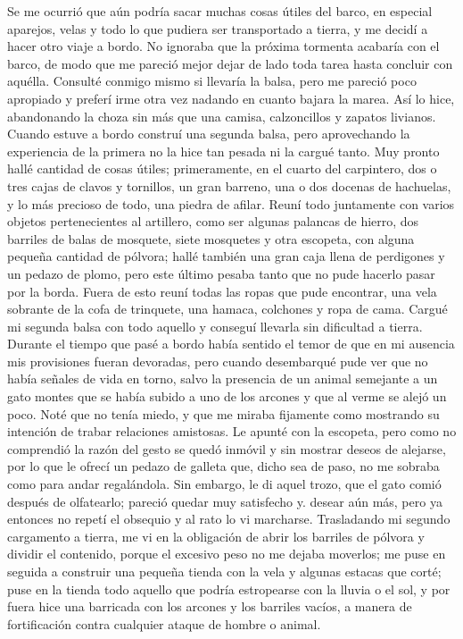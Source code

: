 \documentclass{novela}
\begin{document}
    Se me ocurrió que aún podría sacar muchas cosas útiles del barco, en especial aparejos, velas y todo lo que pudiera ser transportado a tierra, y me decidí a hacer otro viaje a bordo. No ignoraba que la próxima tormenta acabaría con el barco, de modo que me pareció mejor dejar de lado toda tarea hasta concluir con aquélla. Consulté conmigo mismo si llevaría la balsa, pero me pareció poco apropiado y preferí irme otra vez nadando en cuanto bajara la marea. Así lo hice, abandonando la choza sin más que una camisa, calzoncillos y zapatos livianos.
    Cuando estuve a bordo construí una segunda balsa, pero aprovechando la experiencia de la primera no la hice tan pesada ni la cargué tanto. Muy pronto hallé cantidad de cosas útiles; primeramente, en el cuarto del carpintero, dos o tres cajas de clavos y tornillos, un gran barreno, una o dos docenas de hachuelas, y lo más precioso de todo, una piedra de afilar. Reuní todo juntamente con varios objetos pertenecientes al artillero, como ser algunas palancas de hierro, dos barriles de balas de mosquete, siete mosquetes y otra escopeta, con alguna pequeña cantidad de pólvora; hallé también una gran caja llena de perdigones y un pedazo de plomo, pero este último pesaba tanto que no pude hacerlo pasar por la borda. Fuera de esto reuní todas las ropas que pude encontrar, una vela sobrante de la cofa de trinquete, una hamaca, colchones y ropa de cama. Cargué mi segunda balsa con todo aquello y conseguí llevarla sin dificultad a tierra.
    Durante el tiempo que pasé a bordo había sentido el temor de que en mi ausencia mis provisiones fueran devoradas, pero cuando desembarqué pude ver que no había señales de vida en torno, salvo la presencia de un animal semejante a un gato montes que se había subido a uno de los arcones y que al verme se alejó un poco. Noté que no tenía miedo, y que me miraba fijamente como mostrando su intención de trabar relaciones amistosas. Le apunté con la escopeta, pero como no comprendió la razón del gesto se quedó inmóvil y sin mostrar deseos de alejarse, por lo que le ofrecí un pedazo de galleta que, dicho sea de paso, no me sobraba como para andar regalándola. Sin embargo, le di aquel trozo, que el gato comió después de olfatearlo; pareció quedar muy satisfecho y. desear aún más, pero ya entonces no repetí el obsequio y al rato lo vi marcharse.
    Trasladando mi segundo cargamento a tierra, me vi en la obligación de abrir los barriles de pólvora y dividir el contenido, porque el excesivo peso no me dejaba moverlos; me puse en seguida a construir una pequeña tienda con la vela y algunas estacas que corté; puse en la tienda todo aquello que podría estropearse con la lluvia o el sol, y por fuera hice una barricada con los arcones y los barriles vacíos, a manera de fortificación contra cualquier ataque de hombre o animal.
\end{document}

